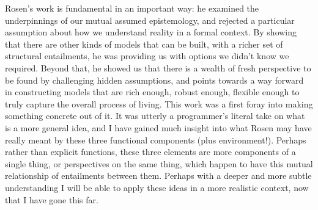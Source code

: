 \documentclass[12pt]{article}
\begin{document}
Rosen's work is fundamental in an important way:  he examined the underpinnings of our mutual assumed epistemology, and rejected a particular assumption about how we understand reality in a formal context.  By showing that there are other kinds of models that can be built, with a richer set of structural entailments, he was providing us with options we didn't know we required.  Beyond that, he showed us that there is a wealth of fresh perspective to be found by challenging hidden assumptions, and points towards a way forward in constructing models that are rich enough, robust enough, flexible enough to truly capture the overall process of living.  This work was a first foray into making something concrete out of it.  It was utterly a programmer's literal take on what is a more general idea, and I have gained much insight into what Rosen may have really meant by these three functional components (plus environment!).  Perhaps rather than explicit functions, these three elements are more components of a single thing, or perspectives on the same thing, which happen to have this mutual relationship of entailments between them.  Perhaps with a deeper and more subtle understanding I will be able to apply these ideas in a more realistic context, now that I have gone this far.



\end{document}
